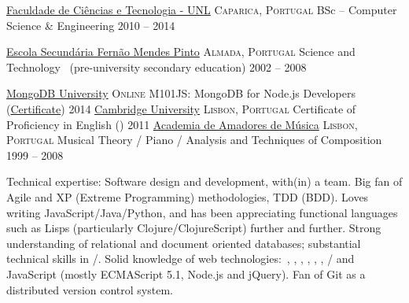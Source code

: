 \documentclass[10pt,a4paper]{article}
\begin{document}
\headedsection
  {\href{http://www.fct.unl.pt}{Faculdade de Ciências e Tecnologia - UNL}}
  {\textsc{Caparica, Portugal}} {
  \headedsubsection
    {BSc -- Computer Science \& Engineering}
    {2010 -- 2014}
    {}
}

\headedsection
  {\href{http://www.esfmp.pt}{Escola Secundária Fernão Mendes Pinto}}
  {\textsc{Almada, Portugal}} {
  \headedsubsection
    {Science and Technology \textnormal{~(pre-university secondary education)}}
    {2002 -- 2008}
    {}
}

\spacedhrule{0.5em}{-0.4em}

\headedsection
  {\href{https://university.mongodb.com}{MongoDB University}}
  {\textsc{Online}} {
  \headedsubsection
    {M101JS: MongoDB for Node.js Developers (\href{http://education.mongodb.com/downloads/certificates/b5bebce320c047bda51f89482ff28948/Certificate.pdf}{Certificate})}
    {2014}
    {}
}
\headedsection
  {\href{http://www.cambridgeenglish.org/}{Cambridge University}}
  {\textsc{Lisbon, Portugal}} {
  \headedsubsection
    {Certificate of Proficiency in English ()}
    {2011}
    {}
}
\headedsection
  {\href{http://www.academiaam.com/}{Academia de Amadores de Música}}
  {\textsc{Lisbon, Portugal}} {
  \headedsubsection
    {Musical Theory / Piano / Analysis and Techniques of Composition}
    {1999 -- 2008}
    {}
}

\spacedhrule{0.5em}{-0.4em}

\inlineheadsection  %
  {Technical expertise:}
  {Software design and development, with(in) a team.  Big fan of Agile and XP (Extreme Programming) methodologies, TDD (BDD).  Loves writing JavaScript/\nsp Java/\nsp Python, and has been appreciating functional languages such as Lisps (particularly Clojure/\nsp ClojureScript) further and further.  Strong understanding of relational and document oriented databases; substantial technical skills in /\nsp {}.  Solid knowledge of web technologies:\ , , , , , , /\nsp{} and JavaScript (mostly ECMAScript 5.1, Node.js and jQuery). Fan of Git as a distributed version control system.}
\end{document}
